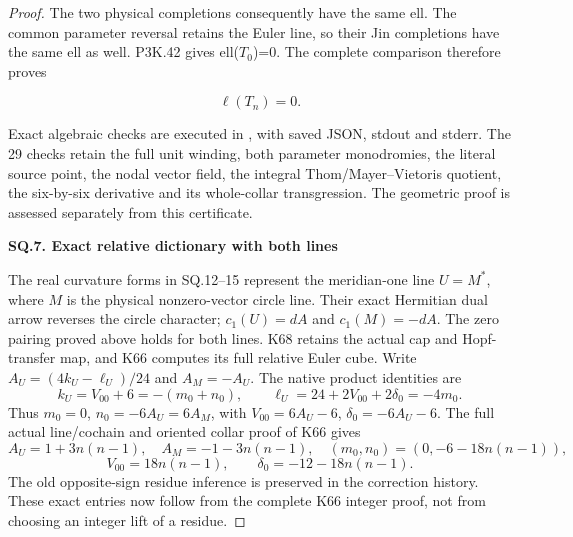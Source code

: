 \begin{proof}
The two physical completions consequently have the same ell.
The common parameter reversal retains the Euler line, so their
Jin completions have the same ell as well. P3K.42 gives ell(\(T_{0}\))=0.
The complete comparison therefore proves

\[
                              \ell(T_n)=0.              \tag{SQ.20}
\]

Exact algebraic checks are executed in , with saved JSON, stdout and stderr. The 29 checks retain the full unit winding, both parameter monodromies, the literal source point, the nodal vector field, the integral Thom/Mayer--Vietoris quotient, the six-by-six derivative and its whole-collar transgression. The geometric proof is assessed separately from this certificate.

\par

\medskip\noindent\textbf{SQ.7. Exact relative dictionary with both lines}

\par\nobreak

The real curvature forms in SQ.12--15 represent the meridian-one
line \(U=M^*\), where \(M\) is the physical nonzero-vector circle
line. Their exact Hermitian dual arrow reverses the circle character;
\(c_1(U)=dA\) and \(c_1(M)=-dA\). The zero pairing proved above
holds for both lines. K68 retains the actual cap and Hopf-transfer
map, and K66 computes its full relative Euler cube. Write
\(A_U=(4k_U-\ell_U)/24\) and \(A_M=-A_U\). The native product
identities are
\[
 k_U=V_{00}+6=-(m_0+n_0),\qquad
 \ell_U=24+2V_{00}+2\delta_0=-4m_0.
\]
Thus \(m_0=0\), \(n_0=-6A_U=6A_M\), with
\(V_{00}=6A_U-6\), \(\delta_0=-6A_U-6\).
The full actual line/cochain and oriented collar proof of K66 gives
\[
 A_U=1+3n(n-1),\quad A_M=-1-3n(n-1),\quad
 (m_0,n_0)=(0,-6-18n(n-1)),
\]
\[
 V_{00}=18n(n-1),\qquad \delta_0=-12-18n(n-1).             \tag{SQ.21}
\]
The old opposite-sign residue inference is preserved in the
correction history. These exact entries now follow from the complete
K66 integer proof, not from choosing an integer lift of a residue.
\end{proof}
